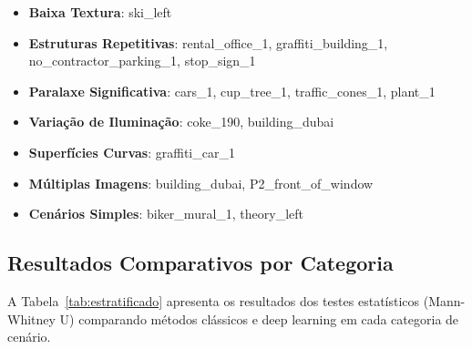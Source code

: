 \begin{itemize}
    \item \textbf{Baixa Textura}: ski\_left
    \item \textbf{Estruturas Repetitivas}: rental\_office\_1, graffiti\_building\_1, no\_contractor\_parking\_1, stop\_sign\_1
    \item \textbf{Paralaxe Significativa}: cars\_1, cup\_tree\_1, traffic\_cones\_1, plant\_1
    \item \textbf{Variação de Iluminação}: coke\_190, building\_dubai
    \item \textbf{Superfícies Curvas}: graffiti\_car\_1
    \item \textbf{Múltiplas Imagens}: building\_dubai, P2\_front\_of\_window
    \item \textbf{Cenários Simples}: biker\_mural\_1, theory\_left
\end{itemize}

\subsection{Resultados Comparativos por Categoria}

A Tabela~\ref{tab:estratificado} apresenta os resultados dos testes estatísticos (Mann-Whitney U) comparando métodos clássicos e deep learning em cada categoria de cenário.

